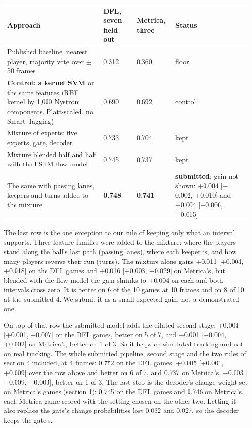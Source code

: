 \documentclass[10pt,a4paper]{article}
\begin{document}
{\footnotesize
\begin{longtable}{>{\raggedright\arraybackslash}p{}>{\raggedright\arraybackslash}p{}>{\raggedright\arraybackslash}p{}>{\raggedright\arraybackslash}p{}}
\toprule
{}\textbf{Approach} & {}\textbf{DFL, seven held out} & {}\textbf{Metrica, three} & {}\textbf{Status} \\
\midrule
\endhead
{}Published baseline: nearest player, majority vote over \ensuremath{\pm}50 frames & {}0.312 & {}0.360 & {}floor \\
\addlinespace[3pt]
{}\textbf{Control: a kernel SVM} on the same features (RBF kernel by 1,000 Nyström components, Platt-scaled, no Smart Tagging) & {}0.690 & {}0.692 & {}control \\
\addlinespace[3pt]
{}Mixture of experts: five experts, gate, decoder & {}0.733 & {}0.704 & {}kept \\
\addlinespace[3pt]
{}Mixture blended half and half with the LSTM flow model & {}0.745 & {}0.737 & {}kept \\
\addlinespace[3pt]
{}The same with passing lanes, keepers and turns added to the mixture & {}\textbf{0.748} & {}\textbf{0.741} & {}\textbf{submitted}; gain not shown: +0.004 [\ensuremath{-}0.002, +0.010] and +0.004 [\ensuremath{-}0.006, +0.015] \\
\bottomrule
\end{longtable}
}


The last row is the one exception to our rule of keeping only what an interval supports. Three
feature families were added to the mixture: where the players stand along the ball's last path
(passing lanes), where each keeper is, and how many players reverse their run (turns). The
mixture alone gains +0.011 [+0.004, +0.018] on the DFL games and +0.016 [+0.003, +0.029] on
Metrica's, but blended with the flow model the gain shrinks to +0.004 on each and both intervals
cross zero. It is better on 6 of the 10 games at 10 frames and on 8 of 10 at the submitted 4. We
submit it as a small expected gain, not a demonstrated one.


On top of that row the submitted model adds the dilated second stage: +0.004 [+0.001, +0.007] on
the DFL games, better on 5 of 7, and \ensuremath{-}0.001 [\ensuremath{-}0.004, +0.002] on Metrica's, better on 1 of 3. So
it helps on simulated tracking and not on real tracking. The whole submitted pipeline, second
stage and the two rules of section 4 included, at 4 frames: 0.752 on the DFL games, +0.005
[+0.001, +0.009] over the row above and better on 6 of 7, and 0.737 on Metrica's, \ensuremath{-}0.003
[\ensuremath{-}0.009, +0.003], better on 1 of 3. The last step is the decoder's change weight set on Metrica's
games (section 1): 0.745 on the DFL games and 0.746 on Metrica's, each Metrica game scored with
the setting chosen on the other two. Letting it also replace the gate's
change probabilities lost 0.032 and 0.027, so the decoder keeps the gate's.
\end{document}
